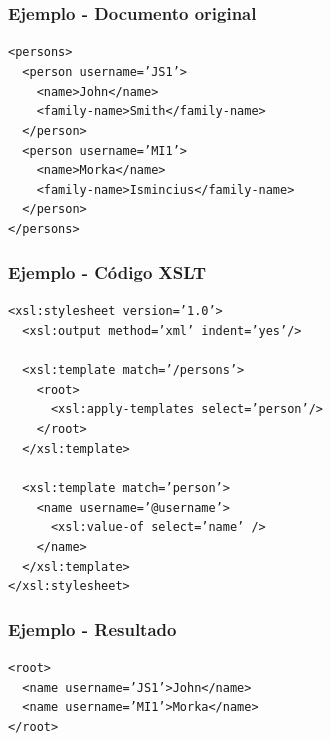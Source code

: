 \begin{frame}
\frametitle{Ejemplo - Documento original}

\footnotesize
\texttt{<persons>					\\
	~~<person username='JS1'>			\\
	~~~~<name>John</name>				\\
	~~~~<family-name>Smith</family-name>		\\
	~~</person>					\\
	~~<person username='MI1'>			\\
	~~~~<name>Morka</name>				\\
	~~~~<family-name>Ismincius</family-name>	\\
	~~</person>					\\
	</persons>}
\end{frame}
\begin{frame}
\frametitle{Ejemplo - Código XSLT}

\footnotesize
\texttt{<xsl:stylesheet version='1.0'>			\\
	~~<xsl:output method='xml' indent='yes'/>	\\
	~						\\
	~~<xsl:template match='/persons'>		\\
	~~~~<root>					\\
	~~~~~~<xsl:apply-templates select='person'/>	\\
	~~~~</root>					\\
	~~</xsl:template>				\\
	~						\\
	~~<xsl:template match='person'>			\\
	~~~~<name username='{@username}'>		\\
	~~~~~~<xsl:value-of select='name' />		\\
	~~~~</name>					\\
	~~</xsl:template>				\\
	</xsl:stylesheet>
	}
\end{frame}

\begin{frame}
\frametitle{Ejemplo - Resultado}

\footnotesize
\texttt{<root>						\\
	~~<name username='JS1'>John</name>		\\
	~~<name username='MI1'>Morka</name>		\\
	</root>
}
\end{frame}
